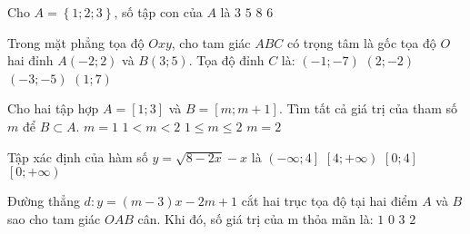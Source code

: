 \begin{ex}%
	Cho $A=\left\{1;2;3\right\}$, số tập con của $A$ là
	\choice
	{$3$}
	{$5$}
	{\True $8$}
	{$6$}
\end{ex}
\begin{ex}%
	Trong mặt phẳng tọa độ $Oxy$, cho tam giác $ABC$ có trọng tâm là gốc tọa độ $O$ hai đỉnh $A\left(-2;2\right)$ và $B\left(3;5\right).$ Tọa độ đỉnh $C$ là:
	\choice
	{\True $\left(-1;-7\right)$}
	{$\left(2;-2\right)$}
	{$\left(-3;-5\right)$}
	{$\left(1; 7\right)$}
\end{ex}
\begin{ex}%
	Cho hai tập hợp $A=\left[1;3\right]$ và $B=\left[m;m+1\right]$. Tìm tất cả giá trị của tham số $m$ để $B\subset A$.
	\choice
	{$m=1$}
	{$1<m<2$}
	{\True $1\le m\le 2$}
	{$m=2$}
\end{ex}
\begin{ex}%
	Tập xác định của hàm số $y=\sqrt{8-2x}-x$ là
	\choice
	{\True $\left(-\infty;4\right]$}
	{$\left[4;+\infty \right)$}
	{$\left[0;4\right]$}
	{$\left[0;+\infty \right)$}
\end{ex}
\begin{ex}%
	Đường thẳng $d:y=\left(m-3\right)x-2m+1$ cắt hai trục tọa độ tại hai điểm $A$ và $B$ sao cho tam giác $OAB$ cân. Khi đó, số giá trị của m thỏa mãn là:
	\choice
	{$1$}
	{$0$}
	{$3$}
	{\True $2$}
\end{ex}
